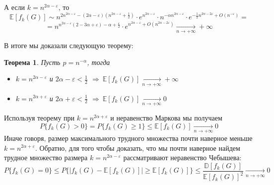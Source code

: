 \documentclass[a4paper]{article}
\newtheorem{mtheorem}{Теорема}[section]
\begin{document}
А если $k = n^{2\alpha - \varepsilon}$, то $$\mathbb{E}[f_k(G)] \sim n^{2n^{2\alpha - \varepsilon} - 
(2\alpha - \varepsilon)(n^{2\alpha - \varepsilon} + \frac{1}{2})}\cdot e^{n^{2\alpha - \varepsilon}}\cdot 
n^{-\alpha n^{2\alpha-\varepsilon}}\cdot e^{-\frac{1}{2}n^{2\alpha - 2\varepsilon} + O\left(n^{-\varepsilon}\right)} = $$
$$ = n^{n^{2\alpha - \varepsilon}(2 - 3\alpha +\varepsilon) - \alpha + \frac{\varepsilon}{2}}\cdot 
e^{n^{2\alpha - \varepsilon}+O(n^{2\alpha - 2\varepsilon})}\xrightarrow[n \to +\infty]{} +\infty$$

В итоге мы доказали следующую теорему:
\begin{mtheorem}
	Пусть $p = n^{-\alpha}$, тогда 
	\begin{itemize}[noitemsep]
		\item $k = n^{2\alpha - \varepsilon}$ и $2\alpha - \varepsilon < \frac{1}{2}$ $\Longrightarrow\ \mathbb{E}[f_k(G)]\xrightarrow[n \to +\infty]{} +\infty$
		\item $k = n^{2\alpha + \varepsilon}$ и $2\alpha + \varepsilon < \frac{1}{2}$  $\Longrightarrow\ \mathbb{E}[f_k(G)]\xrightarrow[n \to +\infty]{} 0$
	\end{itemize}
\end{mtheorem}
Используя теорему при $k = n^{2\alpha + \varepsilon}$ и неравенство Маркова мы получаем
$$P\{f_k(G) > 0\} = P\{f_k(G) \geq 1\} \leq \mathbb{E}[f_k(G)]\xrightarrow[n \to +\infty]{} 0$$
Иначе говоря, размер максимального трудного множества почти наверное меньше $ k = n^{2\alpha + \varepsilon}$.
Обратно, для того чтобы доказать, что мы почти наверное найдем трудное множество размера 
$k = n^{2\alpha - \varepsilon}$ рассматривают неравенство Чебышева: $$P\{f_k(G) = 0\} \leq P\{|f_k(G) - 
\mathbb{E}[f_k(G)]|\geq \mathbb{E}[f_k(G)]\} \leq \frac{\mathbb{D}[f_k(G)]}{\mathbb{E}[f_k(G)]^2}\xrightarrow[n \to +\infty]{} 0$$
\end{document}
